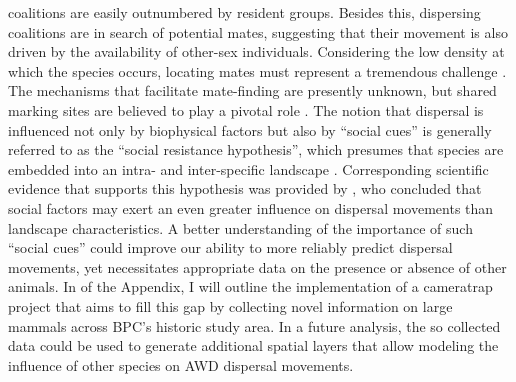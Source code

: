 \documentclass[../FinalThesis.tex]{subfiles}
\begin{document}
coalitions are easily outnumbered by resident groups. Besides this, dispersing
coalitions are in search of potential mates, suggesting that their movement is
also driven by the availability of other-sex individuals. Considering the low
density at which the species occurs, locating mates must represent a tremendous
challenge \citep{Masenga.2016, Woodroffe.2020}. The mechanisms that facilitate
mate-finding are presently unknown, but shared marking sites are believed to
play a pivotal role \citep{Apps.2022, Claase.2022}. The notion that dispersal is
influenced not only by biophysical factors but also by ``social cues'' is
generally referred to as the ``social resistance hypothesis'', which presumes
that species are embedded into an intra- and inter-specific landscape
\citep{Armansin.2020}. Corresponding scientific evidence that supports this
hypothesis was provided by \citet{Cozzi.2018}, who concluded that social factors
may exert an even greater influence on dispersal movements than landscape
characteristics. A better understanding of the importance of such ``social
cues'' could improve our ability to more reliably predict dispersal movements,
yet necessitates appropriate data on the presence or absence of other animals.
In  of the Appendix, I will outline the implementation of
a cameratrap project that aims to fill this gap by collecting novel information
on large mammals across BPC's historic study area. In a future analysis, the so
collected data could be used to generate additional spatial layers that allow
modeling the influence of other species on AWD dispersal movements.

\end{document}
